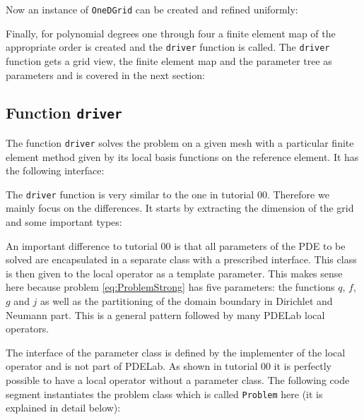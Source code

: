 \documentclass[a4paper,12pt]{article}
\begin{document}
Now an instance of \lstinline{OneDGrid} can be created and
refined uniformly:


Finally, for polynomial degrees one through four a finite element
map of the appropriate order is created and the \lstinline{driver} function
is called. The \lstinline{driver} function gets a grid view, the finite element map
and the parameter tree as parameters and is covered in the next section: 


\subsection{Function \lstinline{driver}}

The function \lstinline{driver} solves the problem on a given mesh 
with a particular finite element method given by its local basis functions
on the reference element. It has the following interface:


The \lstinline{driver} function is very similar to the one in
tutorial 00. Therefore we mainly focus on the differences.
It starts by extracting the dimension of the grid and some 
important types:


An important difference to tutorial 00 is that all parameters 
of the PDE to be solved are encapsulated in a separate class with
a prescribed interface. This class is then given to the local operator
as a template parameter. This makes sense here because problem \eqref{eq:ProblemStrong}
has five parameters: the functions $q$, $f$, $g$ and $j$ as well as
the partitioning of the domain boundary in Dirichlet and Neumann
part. This is a general pattern followed by many PDELab local operators.

The interface of the parameter class is defined by the implementer of the
local operator and is not part of PDELab. As shown in tutorial 00 it is
perfectly possible to have a local operator without a parameter class.
The following code segment instantiates the problem class which 
is called \lstinline{Problem} here (it is explained in detail below):

\end{document}
